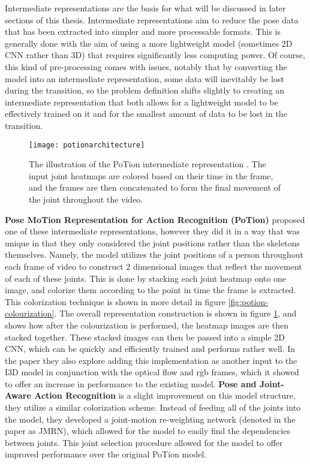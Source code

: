 Intermediate representations are the basis for what will be discussed in later sections of this thesis. Intermediate representations aim to reduce the pose data that has been extracted into simpler and more processable formats. This is generally done with the aim of using a more lightweight model (sometimes 2D CNN rather than 3D) that requires significantly less computing power. Of course, this kind of pre-processing comes with issues, notably that by converting the model into an intermediate representation, some data will inevitably be lost during the transition, so the problem definition shifts slightly to creating an intermediate representation that both allows for a lightweight model to be effectively trained on it and for the smallest amount of data to be lost in the transition.

\begin{figure}[ht]
	\texttt{[image: potionarchitecture]}
	\centering
	\caption{The illustration of the PoTion intermediate representation \cite{potion}. The input joint heatmaps are colored based on their time in the frame, and the frames are then concatenated to form the final movement of the joint throughout the video.}
	\label{fig:potion-architecture}
\end{figure}

\textbf{Pose MoTion Representation for Action Recognition (PoTion)} \cite{potion} proposed one of these intermediate representations, however they did it in a way that was unique in that they only considered the joint positions rather than the skeletons themselves. Namely, the model utilizes the joint positions of a person throughout each frame of video to construct 2 dimensional images that reflect the movement of each of these joints. This is done by stacking each joint heatmap onto one image, and colorize them according to the point in time the frame is extracted. This colorization technique is shown in more detail in figure \ref{fig:potion-colourization}. The overall representation construction is shown in figure \ref{fig:potion-architecture}, and shows how after the colourization is performed, the heatmap images are then stacked together. These stacked images can then be passed into a simple 2D CNN, which can be quickly and efficiently trained and performs rather well. In the paper they also explore adding this implementation as another input to the I3D \cite{i3d} model in conjunction with the optical flow and rgb frames, which it showed to offer an increase in performance to the existing model. \textbf{Pose and Joint-Aware Action Recognition} \cite{poseandjointaware} is a slight improvement on this model structure, they utilize a similar colorization scheme. Instead of feeding all of the joints into the model, they developed a joint-motion re-weighting network (denoted in the paper as JMRN), which allowed for the model to easily find the dependencies between joints. This joint selection procedure allowed for the model to offer improved performance over the original PoTion model.

